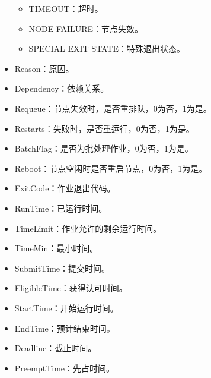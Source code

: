\documentclass[a4paper,12pt,english]{sphinxmanual}
\begin{document}
\begin{itemize}
\begin{itemize}
\item {} 
\sphinxAtStartPar
TIMEOUT：超时。

\item {} 
\sphinxAtStartPar
NODE FAILURE：节点失效。

\item {} 
\sphinxAtStartPar
SPECIAL EXIT STATE：特殊退出状态。

\end{itemize}

\item {} 
\sphinxAtStartPar
Reason：原因。

\item {} 
\sphinxAtStartPar
Dependency：依赖关系。

\item {} 
\sphinxAtStartPar
Requeue：节点失效时，是否重排队，0为否，1为是。

\item {} 
\sphinxAtStartPar
Restarts：失败时，是否重运行，0为否，1为是。

\item {} 
\sphinxAtStartPar
BatchFlag：是否为批处理作业，0为否，1为是。

\item {} 
\sphinxAtStartPar
Reboot：节点空闲时是否重启节点，0为否，1为是。

\item {} 
\sphinxAtStartPar
ExitCode：作业退出代码。

\item {} 
\sphinxAtStartPar
RunTime：已运行时间。

\item {} 
\sphinxAtStartPar
TimeLimit：作业允许的剩余运行时间。

\item {} 
\sphinxAtStartPar
TimeMin：最小时间。

\item {} 
\sphinxAtStartPar
SubmitTime：提交时间。

\item {} 
\sphinxAtStartPar
EligibleTime：获得认可时间。

\item {} 
\sphinxAtStartPar
StartTime：开始运行时间。

\item {} 
\sphinxAtStartPar
EndTime：预计结束时间。

\item {} 
\sphinxAtStartPar
Deadline：截止时间。

\item {} 
\sphinxAtStartPar
PreemptTime：先占时间。


\end{itemize}
\end{document}

